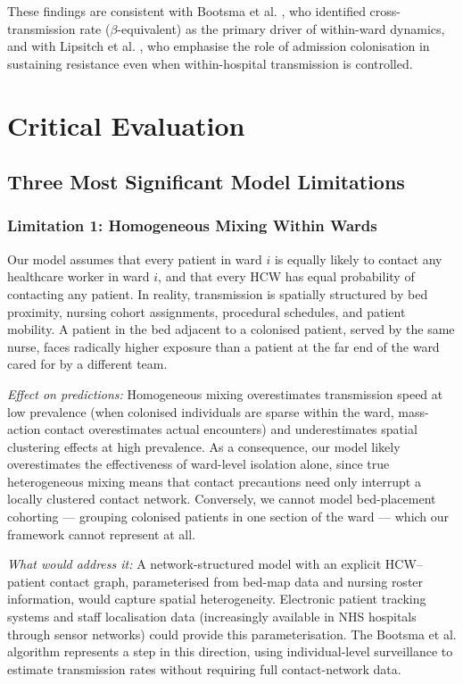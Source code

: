 \documentclass[12pt,a4paper]{article}
\begin{document}
These findings are consistent with Bootsma et al. \cite{bootsma_preprint}, who identified cross-transmission rate ($\beta$-equivalent) as the primary driver of within-ward dynamics, and with Lipsitch et al. \cite{lipsitch2000}, who emphasise the role of admission colonisation in sustaining resistance even when within-hospital transmission is controlled.

\section{Critical Evaluation}

\subsection{Three Most Significant Model Limitations}

\subsubsection{Limitation 1: Homogeneous Mixing Within Wards}

Our model assumes that every patient in ward $i$ is equally likely to contact any healthcare worker in ward $i$, and that every HCW has equal probability of contacting any patient. In reality, transmission is spatially structured by bed proximity, nursing cohort assignments, procedural schedules, and patient mobility. A patient in the bed adjacent to a colonised patient, served by the same nurse, faces radically higher exposure than a patient at the far end of the ward cared for by a different team.

\textit{Effect on predictions:} Homogeneous mixing overestimates transmission speed at low prevalence (when colonised individuals are sparse within the ward, mass-action contact overestimates actual encounters) and underestimates spatial clustering effects at high prevalence. As a consequence, our model likely overestimates the effectiveness of ward-level isolation alone, since true heterogeneous mixing means that contact precautions need only interrupt a locally clustered contact network. Conversely, we cannot model bed-placement cohorting --- grouping colonised patients in one section of the ward --- which our framework cannot represent at all.

\textit{What would address it:} A network-structured model with an explicit HCW--patient contact graph, parameterised from bed-map data and nursing roster information, would capture spatial heterogeneity. Electronic patient tracking systems and staff localisation data (increasingly available in NHS hospitals through sensor networks) could provide this parameterisation. The Bootsma et al. algorithm \cite{bootsma_preprint} represents a step in this direction, using individual-level surveillance to estimate transmission rates without requiring full contact-network data.
\end{document}
